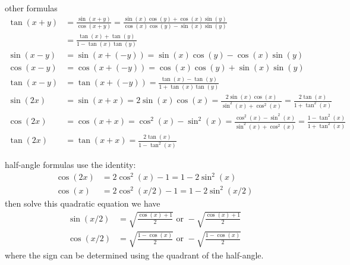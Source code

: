 \documentclass{article}
\begin{document}
\begin{myleftlinebox}
	other formulas 
	\tcblower
	\begin{equation*}
		\begin{split}
			\tan(x+y) &= \frac{\sin(x+y)}{\cos(x+y)}=\frac{\sin(x)\cos(y)+\cos(x)\sin(y)}{\cos(x)\cos(y)-\sin(x)\sin(y)}\\
			&= \frac{\tan(x)+\tan(y)}{1-\tan(x)\tan(y)}\\
			\sin(x-y)&= \sin(x+(-y)) = \sin(x)\cos(y)-\cos(x)\sin(y)\\
			\cos(x-y)&= \cos(x+(-y)) = \cos(x)\cos(y)+\sin(x)\sin(y)\\
			\tan(x-y)&= \tan(x+(-y)) =  \frac{\tan(x)-\tan(y)}{1+\tan(x)\tan(y)}\\
			\sin(2x) &= \sin(x+x) = 2\sin(x)\cos(x)=\frac{2\sin(x)\cos(x)}{\sin^2(x)+\cos^2(x)} = \frac{2\tan(x)}{1+\tan^2(x)}\\
			\cos(2x) &= \cos(x+x) = \cos^2(x)-\sin^2(x)=\frac{\cos^2(x)-\sin^2(x)}{\sin^2(x)+\cos^2(x)} = \frac{1-\tan^2(x)}{1+\tan^2(x)}\\
			\tan(2x) &= \tan(x+x) = \frac{2\tan(x)}{1-\tan^2(x)}
		\end{split}
	\end{equation*}
\end{myleftlinebox}

\begin{myleftlinebox}
	half-angle formulas 
	\tcblower
	use the identity:
	\begin{equation*}
		\begin{split}
			\cos(2x)&=2\cos^2(x)-1=1-2\sin^2(x)\\
			\cos(x) &=2\cos^2(x/2)-1=1-2\sin^2(x/2)
		\end{split}
	\end{equation*}
	then solve this quadratic equation we have
	\begin{equation*}
		\begin{split}
			\sin(x/2) &= \sqrt{\frac{\cos(x)+1}{2}} \text{ or } -\sqrt{\frac{\cos(x)+1}{2}}\\
			\cos(x/2) &= \sqrt{\frac{1-\cos(x)}{2}} \text{ or } -\sqrt{\frac{1-\cos(x)}{2}}
		\end{split}
	\end{equation*}
	where the sign can be determined using the quadrant of the half-angle.  
\end{myleftlinebox}
\end{document}
